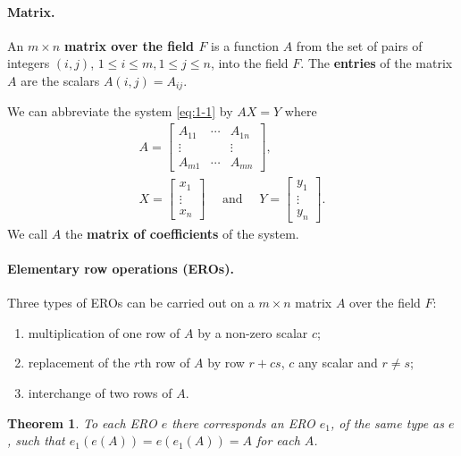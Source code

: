 \documentclass{article}
\newtheorem{theorem}{Theorem}[section]
\begin{document}
\paragraph{Matrix.} An $m \times n$ \textbf{matrix over the field $F$} is a
function $A$ from the set of pairs of integers $(i, j)$, $1 \leq i \leq m, 1
\leq j \leq n$, into the field $F$. The \textbf{entries} of the matrix $A$ are
the scalars $A(i, j) = A_{ij}$.

We can abbreviate the system \eqref{eq:1-1} by $AX = Y$ where
\begin{gather*}
  A = \begin{bmatrix}
    A_{11} & \cdots & A_{1n} \\
    \vdots & & \vdots \\
    A_{m1} & \cdots & A_{mn}
  \end{bmatrix}, \\
  X = \begin{bmatrix}
    x_1 \\
    \vdots \\
    x_n
  \end{bmatrix}
  \quad\text{ and }\quad
  Y = \begin{bmatrix}
    y_1 \\
    \vdots \\
    y_n
  \end{bmatrix}.
\end{gather*}
We call $A$ the \textbf{matrix of coefficients} of the system.

\paragraph{Elementary row operations (EROs).} Three types of EROs can be carried
out on a $m \times n$ matrix $A$ over the field $F$:
\begin{enumerate}
  \item multiplication of one row of $A$ by a non-zero scalar $c$;
  \item replacement of the $r$th row of $A$ by row $r + cs$, $c$ any scalar and
    $r \neq s$;
  \item interchange of two rows of $A$.
\end{enumerate}

\begin{theorem}
  To each ERO $e$ there corresponds an ERO $e_1$, of the same type as $e$, such
  that $e_1(e(A)) = e(e_1(A)) = A$ for each $A$.
\end{theorem}
\end{document}
